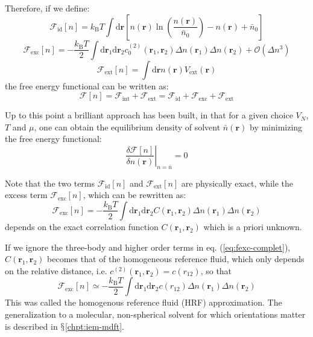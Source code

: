 Therefore, if we define:
\begin{equation}
\mathcal{F}_{\mathrm{id}}[n]=k_{\mathrm{B}}T\int\mathrm{d}\mathbf{r}\left[n(\mathbf{r})\ln\left(\dfrac{n(\mathbf{r})}{\bar{n}_{0}}\right)-n(\mathbf{r})+\bar{n}_{0}\right]
\end{equation}
\begin{equation}
\mathcal{F}_{\mathrm{exc}}[n]=-\frac{k_{\mathrm{B}}T}{2}\int\mathrm{d}\mathbf{\mathbf{r}}_{1}\mathrm{d}\mathbf{r}_{2}c_{0}^{(2)}(\mathbf{r}_{1},\mathbf{r}_{2})\Delta n(\mathbf{r}_{1})\Delta n(\mathbf{r}_{2})+\mathcal{O}(\Delta n{}^{3})\label{eq:fexc-complet}
\end{equation}
\begin{equation}
\mathcal{F}_{\mathrm{ext}}[n]=\int\mathrm{d}\mathbf{r}n(\mathbf{r})V_{\mathrm{ext}}(\mathbf{r})
\end{equation}
the free energy functional can be written as:
\begin{equation}
\mathcal{F}[n]=\mathcal{F}_{\mathrm{int}}+\mathcal{F}_{\mathrm{ext}}=\mathcal{F}_{\mathrm{id}}+\mathcal{F}_{\mathrm{exc}}+\mathcal{F}_{\mathrm{ext}}
\end{equation}

Up to this point a brilliant approach has been built, in that for a given
choice $V_{N}$, $T$ and $\mu$, one can obtain the equilibrium density
of solvent $\bar{n}(\mathbf{r})$ by minimizing the free energy functional:
\begin{equation}
\left.\frac{\delta\mathcal{F}[n]}{\delta n(\mathbf{r})}\right|_{n=\bar{n}}=0\label{eq:1.59}
\end{equation}

Note that the two terms $\mathcal{F}_{\mathrm{id}}[n]$ and $\mathcal{F}_{\mathrm{ext}}[n]$
are physically exact, while the excess term $\mathcal{F}_{\mathrm{exc}}[n]$,
which can be rewritten as:
\begin{equation}
\mathcal{F}_{\mathrm{exc}}[n]=-\frac{k_{\mathrm{B}}T}{2}\int\mathrm{d}\mathbf{\mathbf{r}}_{1}\mathrm{d}\mathbf{r}_{2}C(\mathbf{r}_{1},\mathbf{r}_{2})\Delta n(\mathbf{r}_{1})\Delta n(\mathbf{r}_{2})
\end{equation}
depends on the exact correlation function $C(\mathbf{r}_{1},\mathbf{r}_{2})$
which is a priori unknown.

If we ignore the three-body and higher order terms in eq. (\ref{eq:fexc-complet}),
$C(\mathbf{r}_{1},\mathbf{r}_{2})$ becomes that of the homogeneous
reference fluid, which only depends on the relative distance, i.e.
$c^{(2)}(\mathbf{r}_{1},\mathbf{r}_{2})=c(r_{12})$, so that
\begin{equation}
\mathcal{F}_{\mathrm{exc}}\left[n\right]\simeq-\frac{k_{\mathrm{B}}T}{2}\int\mathrm{d}\mathbf{\mathbf{r}}_{1}\mathrm{d}\mathbf{r}_{2}c(r_{12})\Delta n(\mathbf{r}_{1})\Delta n(\mathbf{r}_{2})
\end{equation}
This was called the homogenous reference fluid (\acs{HRF}) approximation.
The generalization to a molecular, non-spherical solvent for which
orientations matter is described in $\mathsection$\ref{chpt:iem-mdft}.

